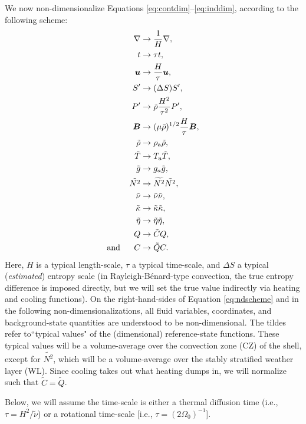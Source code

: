\documentclass[12pt]{article}
\numberwithin{equation}{section}
\newcommand{\tmpa}{T_{\rm a}}
\newcommand{\rhoa}{\rho_{\rm a}}
\begin{document}
	We now non-dimensionalize Equations \eqref{eq:contdim}--\eqref{eq:inddim}, according to the following scheme:
	\begin{subequations}\label{eq:ndscheme}
	\begin{align}
		\nabla &\rightarrow \frac{1}{H}\nabla,\\
		t &\rightarrow \tau t,\\
		\vecu &\rightarrow \frac{H}{\tau} \vecu,\\
		\entrprime &\rightarrow (\Delta S) \entrprime,\\
		\prsprime &\rightarrow \tilde{\rho} \frac{H^2}{\tau^2} \prsprime,\\
		\vecb &\rightarrow (\mu\tilde{\rho})^{1/2}\frac{H}{\tau} \vecb,\\ 
		\rhotilde &\rightarrow \rhoa \rhotilde, \\
		\tmptilde &\rightarrow \tmpa \tmptilde,\\
		\gtilde &\rightarrow g_a \gtilde,\\
		\nsqtilde &\rightarrow \widetilde{N^2} \nsqtilde,\\
		\nutilde &\rightarrow \tilde{\nu}\nutilde,\\
		\kappatilde &\rightarrow \tilde{\kappa}\kappatilde,\\
		 \etatilde &\rightarrow \tilde{\eta}\etatilde,\\ 
		Q &\rightarrow \tilde{C} Q,\\
		\andd C &\rightarrow \tilde{Q} C.
	\end{align}
	\end{subequations}
	Here, $H$ is a typical length-scale, $\tau$ a typical time-scale, and $\Delta S$ a typical (\textit{estimated}) entropy scale (in Rayleigh-B\'enard-type convection, the true entropy difference is imposed directly, but we will set the true value indirectly via heating and cooling functions). On the right-hand-sides of Equation \eqref{eq:ndscheme} and in the following non-dimensionalizations, all fluid variables, coordinates, and background-state quantities are understood to be non-dimensional. The tildes refer to``typical values" of the (dimensional) reference-state functions. These typical values will be a volume-average over the convection zone (CZ) of the shell, except for $\widetilde{N^2}$, which will be a volume-average over the stably stratified weather layer (WL). Since cooling takes out what heating dumps in, we will normalize such that $\tilde{C}=\tilde{Q}$. 
	
	Below, we will assume the time-scale is either a thermal diffusion time (i.e., $\tau=H^2/\tilde{\nu}$) or a rotational time-scale [i.e., $\tau=(2\Omega_0)^{-1}$]. %
	
\end{document}
